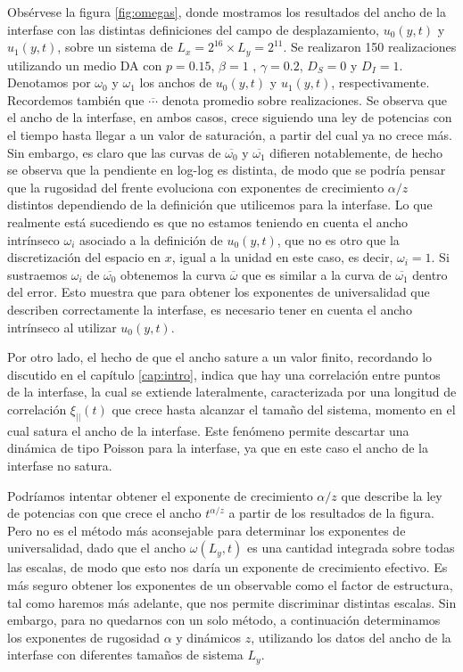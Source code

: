 Obsérvese la figura \ref{fig:omegas}, donde mostramos los resultados del ancho de la interfase con las distintas definiciones del campo de desplazamiento, $u_0(y,t)$ y $u_1(y,t)$, sobre un sistema de $L_x = 2^{16} \times L_y = 2^{11}$. Se realizaron 150 realizaciones utilizando un medio DA con $p=0.15$, $\beta = 1$ , $\gamma = 0.2$, $D_S = 0$ y $D_I=1$. Denotamos por $\omega_0$ y $\omega_1$ los anchos de $u_0(y,t)$ y $u_1(y,t)$, respectivamente. Recordemos también que $\overline{\cdots}$ denota promedio sobre realizaciones. Se observa que el ancho de la interfase, en ambos casos, crece siguiendo una ley de potencias con el tiempo hasta llegar a un valor de saturación, a partir del cual ya no crece más. Sin embargo, es claro que las curvas de $\overline{\omega_0}$ y $\overline{\omega_1}$ difieren notablemente, de hecho se observa que la pendiente en log-log es distinta, de modo que se podría pensar que la rugosidad del frente evoluciona con exponentes de crecimiento $\alpha/z$ distintos dependiendo de la definición que utilicemos para la interfase. Lo que realmente está sucediendo es que no estamos teniendo en cuenta el ancho intrínseco $\omega_i$ \cite{barabasi} asociado a la definición de $u_0(y,t)$, que no es otro que la discretización del espacio en $x$, igual a la unidad en este caso, es decir, $\omega_i = 1$. Si sustraemos $\omega_i$ de $\overline{\omega_0}$ obtenemos la curva $\overline{\omega}$ que es similar a la curva de $\overline{\omega_1}$ dentro del error. Esto muestra que para obtener los exponentes de universalidad que describen correctamente la interfase, es necesario tener en cuenta el ancho intrínseco al utilizar $u_0(y,t)$. 

Por otro lado, el hecho de que el ancho sature a un valor finito, recordando lo discutido en el capítulo \ref{cap:intro}, indica que hay una correlación entre puntos de la interfase, la cual se extiende lateralmente, caracterizada por una longitud de correlación $\xi_{||}(t)$ que crece hasta alcanzar el tamaño del sistema, momento en el cual satura el ancho de la interfase. Este fenómeno permite descartar una dinámica de tipo Poisson para la interfase, ya que en este caso el ancho de la interfase no satura.

Podríamos intentar obtener el exponente de crecimiento $\alpha/z$ que describe la ley de potencias con que crece el ancho $t^{\alpha/z}$ a partir de los resultados de la figura. Pero no es el método más aconsejable para determinar los exponentes de universalidad, dado que el ancho $\omega(L_y,t)$ es una cantidad integrada sobre todas las escalas, de modo que esto nos daría un exponente de crecimiento efectivo. Es más seguro obtener los exponentes de un observable como el factor de estructura, tal como haremos más adelante, que nos permite discriminar distintas escalas. Sin embargo, para no quedarnos con un solo método, a continuación determinamos los exponentes de rugosidad $\alpha$ y dinámicos $z$, utilizando los datos del ancho de la interfase con diferentes tamaños de sistema $L_y$.



